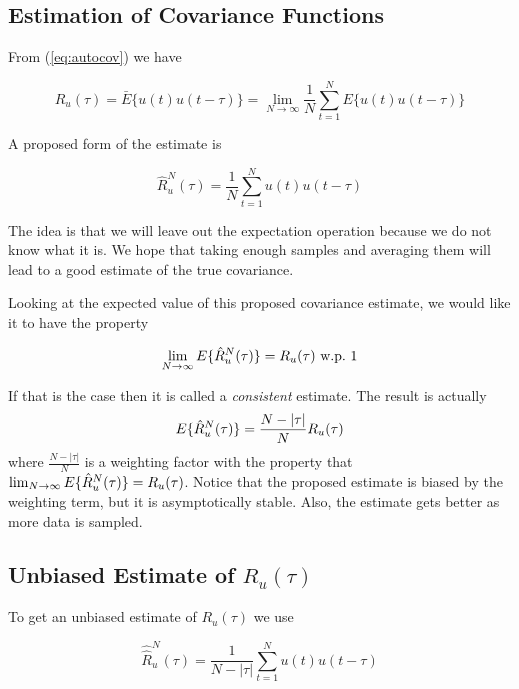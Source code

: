 \subsection{Estimation of Covariance Functions}
From (\ref{eq:autocov}) we have

\begin{equation*}
R_u(\tau) = \bar{E}\{u(t)u(t-\tau)\} = \lim_{N\to\infty}\frac{1}{N}\sum_{t=1}^N E\{u(t)u(t-\tau)\}
\end{equation*}

A proposed form of the estimate is

\begin{equation*}
\hat{R}_u^N(\tau) = \frac{1}{N}\sum_{t=1}^N u(t)u(t-\tau)
\end{equation*}

The idea is that we will leave out the expectation operation because we do not know what it is.
We hope that taking enough samples and averaging them will lead to a good estimate of the true covariance.

Looking at the expected value of this proposed covariance estimate, we would like it to have the property

\begin{equation*}
\lim_{N\to\infty} E\{\hat{R}_u^N (\tau)\} = R_u(\tau) \text{~w.p.~} 1
\end{equation*}

If that is the case then it is called a \textit{consistent} estimate.
The result is actually
\begin{align}
\label{eq:autocovest}
E\{\hat{R}_u^N (\tau)\} = \frac{N-|\tau|}{N}R_u(\tau)
\end{align}
where $\frac{N-|\tau|}{N}$ is a weighting factor with the property that $\lim_{N\to\infty}E\{\hat{R}_u^N (\tau)\}=R_u(\tau)$.
Notice that the proposed estimate is biased by the weighting term, but it is asymptotically stable.
Also, the estimate gets better as more data is sampled.

\subsection{Unbiased Estimate of $R_u(\tau)$}
To get an unbiased estimate of $R_u(\tau)$ we use

\begin{equation*}
\hat{\hat{R}}_u^N(\tau) = \frac{1}{N-|\tau|}\sum_{t=1}^N u(t)u(t-\tau)
\end{equation*}

